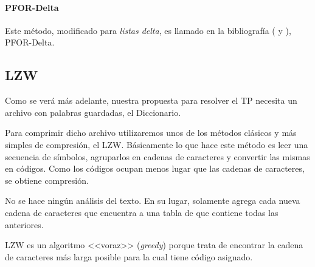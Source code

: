 \paragraph{PFOR-Delta}

Este método, modificado para \textit{listas delta}, es llamado en la bibliografía (\cite{Zhang:2008} y \cite{Zukowski:2006}), PFOR-Delta.


\subsection{LZW}

Como se verá más adelante, nuestra propuesta para resolver el TP necesita un archivo con palabras guardadas, el Diccionario. 

Para comprimir dicho archivo utilizaremos unos de los métodos clásicos y más simples de compresión, el LZW. Básicamente lo que hace este método es leer una secuencia de símbolos, agruparlos en cadenas de caracteres y convertir las mismas en códigos. Como los códigos ocupan menos lugar que las cadenas de caracteres, se obtiene compresión.

No se hace ningún análisis del texto. En su lugar, solamente agrega cada nueva cadena de caracteres que encuentra a una tabla de que contiene todas las anteriores.

LZW es un algoritmo <<voraz>> (\textit{greedy}) porque trata de encontrar la cadena de caracteres más larga posible para la cual tiene código asignado.


%
